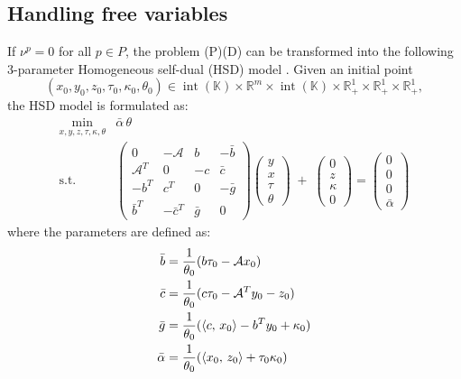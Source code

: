 \subsection{Handling free variables}
If $\nu^p = 0$ for all $p \in P$, the problem (P)(D) can be transformed into the following 3-parameter Homogeneous self-dual (HSD) model \cite{Wright1997}.
Given an initial point 
\[
(x_0, y_0, z_0, \tau_0, \kappa_0, \theta_0) \in 
  \operatorname{int}(\mathbb{K}) \times \mathbb{R}^m \times \operatorname{int}(\mathbb{K})
  \times \mathbb{R}^1_+ \times \mathbb{R}^1_+ \times \mathbb{R}^1_+,
\]
the HSD model is formulated as:
\[
  \begin{array}{cl}
   \min_{x,y,z,\tau,\kappa,\theta} & \bar{\alpha}\,\theta \\[3pt]
   \text{s.t.}
   & \begin{pmatrix}
       0 & -\mathcal{A} & b & -\bar{b}\\
       \mathcal{A}^T & 0 & -c & \bar{c}\\
       -b^T & c^T & 0 & -\bar{g}\\
       \bar{b}^T & -\bar{c}^T & \bar{g} & 0
     \end{pmatrix}
     \begin{pmatrix} y \\ x \\ \tau \\ \theta \end{pmatrix}
   \;+\;
     \begin{pmatrix} 0 \\ z \\ \kappa \\ 0 \end{pmatrix}
   =
     \begin{pmatrix} 0 \\ 0 \\ 0 \\ \bar{\alpha} \end{pmatrix}
  \end{array}
\]
where the parameters are defined as:
\begin{align*}
    \bar{b} &= \frac{1}{\theta_0}(b\tau_0 - \mathcal{A}x_0) \\
    \bar{c} &= \frac{1}{\theta_0}(c\tau_0 - \mathcal{A}^T y_0 - z_0) \\
    \bar{g} &= \frac{1}{\theta_0}(\left\langle c, \, x_0 \right\rangle - b^Ty_0 + \kappa_0) \\
    \bar{\alpha} &= \frac{1}{\theta_0} (\left\langle x_0, \, z_0 \right\rangle + \tau_0 \kappa_0)
\end{align*}

